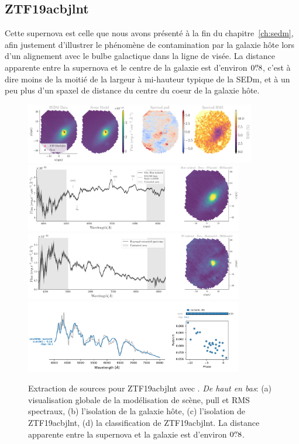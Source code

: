 \documentclass[../main/main.tex]{subfiles}
\begin{document}
\subsection{ZTF19acbjlnt}

Cette supernova est celle que nous avons présenté à la fin du
chapitre~\ref{ch:sedm}, afin justement d'illustrer le phénomène de
contamination par la galaxie hôte lors d'un alignement avec le bulbe
galactique dans la ligne de visée. La distance apparente entre la
supernova et le centre de la galaxie est d'environ $0\overset{\prime\prime}{.}8$, c'est à dire moins de la moitié
de la largeur à mi-hauteur typique de la SEDm, et à un peu plus d'un spaxel
de distance du centre du coeur de la galaxie hôte.
\begin{figure}[ht]
  \centering
  \includegraphics[width=0.9\textwidth]{../figures/07_scene/scene_rmspull_ZTF19acbjlnt.png}
  \includegraphics[width=0.85\textwidth]{../figures/07_scene/output_host_ZTF19acbjlnt.png}
  \includegraphics[width=0.85\textwidth]{../figures/07_scene/output_target_ZTF19acbjlnt.png}
  \includegraphics[width=0.85\textwidth]{../figures/07_scene/ZTF19acbjlnt_snid_typing.pdf}
  \caption[Extraction de sources pour ZTF19acbjlnt.]{Extraction de
    sources pour ZTF19acbjlnt avec \hypergal. \emph{De haut en bas}:
    (a) visualisation globale de la modélisation de scène, pull et RMS
    spectraux, (b) l'isolation de la galaxie hôte, (c) l'isolation de
    ZTF19acbjlnt, (d) la classification de ZTF19acbjlnt. La distance apparente entre la
supernova et la galaxie est d'environ $0\overset{\prime\prime}{.}8$.}
  \label{}
\end{figure}
\end{document}
